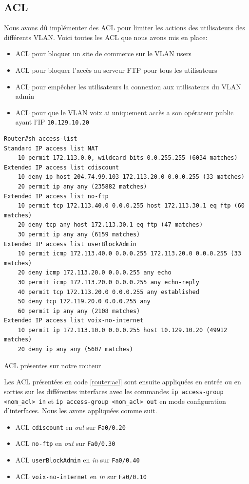 \documentclass{article}
\begin{document}
\subsection{ACL}
Nous avons dû implémenter des ACL pour limiter les actions des utilisateurs des différents VLAN. Voici toutes les ACL que nous avons mis en place:
\begin{itemize}
    \item ACL pour bloquer un site de commerce sur le VLAN users
    \item ACL pour bloquer l'accès au serveur FTP pour tous les utilisateurs
    \item ACL pour empêcher les utilisateurs la connexion aux utilisateurs du VLAN admin
    \item ACL pour que le VLAN voix ai uniquement accès a son opérateur public ayant l'IP \verb|10.129.10.20|
\end{itemize}
\begin{listing}[H]
    \begin{verbatim}
Router#sh access-list
Standard IP access list NAT
    10 permit 172.113.0.0, wildcard bits 0.0.255.255 (6034 matches)
Extended IP access list cdiscount
    10 deny ip host 204.74.99.103 172.113.20.0 0.0.0.255 (33 matches)
    20 permit ip any any (235882 matches)
Extended IP access list no-ftp
    10 permit tcp 172.113.40.0 0.0.0.255 host 172.113.30.1 eq ftp (60 matches)
    20 deny tcp any host 172.113.30.1 eq ftp (47 matches)
    30 permit ip any any (6159 matches)
Extended IP access list userBlockAdmin
    10 permit icmp 172.113.40.0 0.0.0.255 172.113.20.0 0.0.0.255 (33 matches)
    20 deny icmp 172.113.20.0 0.0.0.255 any echo
    30 permit icmp 172.113.20.0 0.0.0.255 any echo-reply
    40 permit tcp 172.113.20.0 0.0.0.255 any established
    50 deny tcp 172.119.20.0 0.0.0.255 any
    60 permit ip any any (2108 matches)
Extended IP access list voix-no-internet
    10 permit ip 172.113.10.0 0.0.0.255 host 10.129.10.20 (49912 matches)
    20 deny ip any any (5607 matches) 
    \end{verbatim}
    \caption{ACL présentes sur notre routeur}
    \label{router:acl}
\end{listing}
Les ACL présentées en code \ref{router:acl} sont ensuite appliquées en entrée ou en sorties sur les différentes interfaces avec les commandes \verb|ip access-group <nom_acl> in| et \verb|ip access-group <nom_acl> out| en mode configuration d'interfaces.
Nous les avons appliquées comme suit.
\begin{itemize}
    \item ACL \verb|cdiscount| en \emph{out} sur \verb|Fa0/0.20|
    \item ACL \verb|no-ftp| en \emph{out} sur \verb|Fa0/0.30|
    \item ACL \verb|userBlockAdmin| en \emph{in} sur \verb|Fa0/0.40|
    \item ACL \verb|voix-no-internet| en \emph{in} sur \verb|Fa0/0.10|
\end{itemize}
\end{document}
